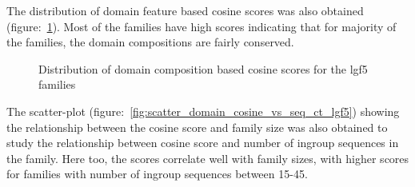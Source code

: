 \documentclass{article}
\begin{document}
		The distribution of domain feature based cosine scores was also obtained (figure:~\ref{fig:hist_domain_cosine_scores_lgf5}). Most of the families have high scores indicating that for majority of the families, the domain compositions are fairly conserved. 
		
		\begin{figure}
			\caption{Distribution of domain composition based cosine scores for the lgf5 families}
			\label{fig:hist_domain_cosine_scores_lgf5}
		\end{figure}
		
		The scatter-plot (figure:~\ref{fig:scatter_domain_cosine_vs_seq_ct_lgf5}) showing the relationship between the cosine score and family size was also obtained to study the relationship between cosine score and number of ingroup sequences in the family. Here too, the scores correlate well with family sizes, with higher scores for families with number of ingroup sequences between 15-45.
		
\end{document}
